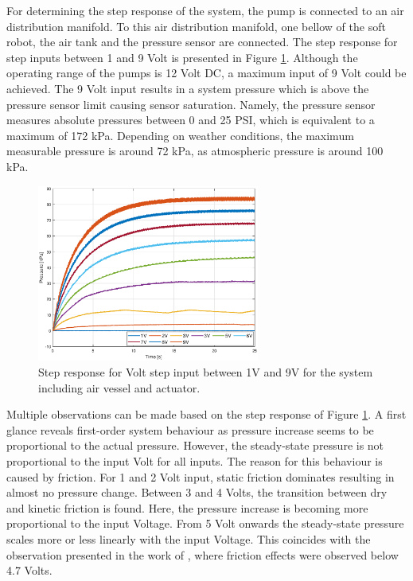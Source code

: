 For determining the step response of the system, the pump is connected to an air distribution manifold. To this air distribution manifold, one bellow of the soft robot, the air tank and the pressure sensor are connected. The step response for step inputs between 1 and 9 Volt is presented in Figure \ref{fig3:pump_dynamics_adapted}. Although the operating range of the pumps is 12 Volt DC, a maximum input of 9 Volt could be achieved. The 9 Volt input results in a system pressure which is above the pressure sensor limit causing sensor saturation. Namely, the pressure sensor measures absolute pressures between 0 and 25 PSI, which is equivalent to a maximum of 172 kPa. Depending on weather conditions, the maximum measurable pressure is around 72 kPa, as atmospheric pressure is around 100 kPa.

\begin{figure}[H]
    \centering
    \includegraphics[width = 0.65\textwidth]{Figures/Chapter3/stepnewairtankbellow.eps}
    \caption{Step response for Volt step input between 1V and 9V for the system including air vessel and actuator.}
    \label{fig3:pump_dynamics_adapted}
\end{figure}


Multiple observations can be made based on the step response of Figure \ref{fig3:pump_dynamics_adapted}. A first glance reveals first-order system behaviour as pressure increase seems to be proportional to the actual pressure. However, the steady-state pressure is not proportional to the input Volt for all inputs. The reason for this behaviour is caused by friction. For 1 and 2 Volt input, static friction dominates resulting in almost no pressure change. Between 3 and 4 Volts, the transition between dry and kinetic friction is found. Here, the pressure increase is becoming more proportional to the input Voltage. From 5 Volt onwards the steady-state pressure scales more or less linearly with the input Voltage. This coincides with the observation presented in the work of \cite{berkers}, where friction effects were observed below 4.7 Volts.

